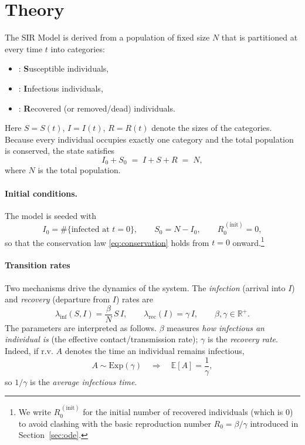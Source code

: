 \section*{Theory}

The SIR Model is derived from a population of fixed size $N$ that is partitioned at every time $t$ into categories:
\newcommand{\sym}[1]{\makebox[1.1em][r]{$#1$}}
\begin{itemize}
  \item \sym{S} : \textbf{S}usceptible individuals,
  \item \sym{I} : \textbf{I}nfectious individuals,
  \item \sym{R} : \textbf{R}ecovered (or removed/dead) individuals.
\end{itemize}
Here $S=S(t)$, $I=I(t)$, $R=R(t)$ denote the sizes of the categories. Because every individual occupies exactly one category and the total population is
conserved, the state satisfies
\begin{equation}
  I_0 + S_0 \;=\; I + S + R \;=\; N ,
  \label{eq:conservation}
\end{equation}
where $N$ is the total population.
\newline
\paragraph{Initial conditions.}
The model is seeded with
\begin{equation}
  I_0 = \#\{\text{infected at } t=0\}, \qquad
  S_0 = N - I_0, \qquad
  R_0^{\,(\text{init})} = 0 ,
  \label{eq:ic}
\end{equation}
so that the conservation law \eqref{eq:conservation} holds from $t=0$
onward.\footnote{We write $R_0^{\,(\text{init})}$ for the initial number of
recovered individuals (which is $0$) to avoid clashing with the basic
reproduction number $R_0=\beta/\gamma$ introduced in
Section~\ref{sec:ode}.}
\newline
\paragraph{Transition rates}
Two mechanisms drive the dynamics of the system. The \emph{infection} (arrival into $I$) and
\emph{recovery} (departure from $I$) rates are
\begin{equation}
  \lambda_{\mathrm{inf}}(S,I) = \frac{\beta}{N}\,S\,I,
  \qquad
  \lambda_{\mathrm{rec}}(I) = \gamma\, I,
  \qquad \beta,\gamma \in \mathbb{R}^{+}.
  \label{eq:rates}
\end{equation}
The parameters are interpreted as follows. $\beta$ measures
\emph{how infectious an individual is} (the effective contact/transmission
rate); $\gamma$ is the \emph{recovery rate}. Indeed, if r.v. $A$ denotes the time an individual remains infectious,
\begin{equation}
  A \sim \mathrm{Exp}(\gamma)
  \quad\Longrightarrow\quad
  \mathbb{E}[A] = \frac{1}{\gamma},
  \label{eq:meaninf}
\end{equation}
so $1/\gamma$ is the \emph{average infectious time}.

